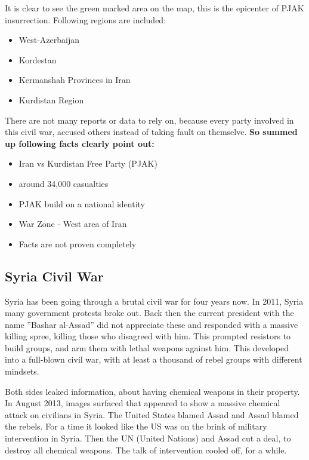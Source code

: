 It is clear to see the green marked area on the map, this is the epicenter of PJAK insurrection.
Following regions are included:
\begin{itemize}
	\item West-Azerbaijan
	\item Kordestan
	\item Kermanshah Provinces in Iran
	\item Kurdistan Region
\end{itemize}

There are not many reports or data to rely on, because every party involved in this civil war, accused others instead of taking fault on themselve. \textbf{So summed up following facts clearly point out:}

\begin{itemize}
	\item Iran vs Kurdistan Free Party (PJAK)
	\item around 34,000 casualties
	\item PJAK build on a national identity
	\item War Zone - West area of Iran
	\item Facts are not proven completely
\end{itemize}

\subsection{Syria Civil War}
Syria has been going through a brutal civil war for four years now. In 2011, Syria many government protests broke out.
Back then the current president with the name ''Bashar al-Assad'' did not appreciate these and responded with a massive killing spree, killing those who disagreed with him. This prompted resistors to build groups, and arm them with lethal weapons against him. This developed into a full-blown civil war, with at least a thousand of rebel groups with different mindsets.

Both sides leaked information, about having chemical weapons in their property. In August 2013, images surfaced that appeared to show a massive chemical attack on civilians in Syria. The United States blamed Assad and Assad blamed the rebels.
For a time it looked like the US was on the brink of military intervention in Syria. Then the UN (United Nations) and Assad cut a deal, to destroy all chemical weapons. The talk of intervention cooled off, for a while. \newline



